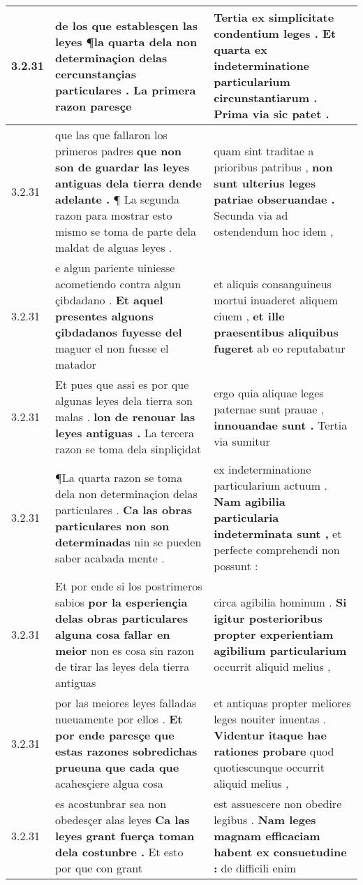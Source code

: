 \begin{tabular}{|p{1cm}|p{6.5cm}|p{6.5cm}|}
3.2.31 & de los que establesçen las leyes \textbf{ ¶la quarta dela non determinaçion delas cercunstançias particulares . } La primera razon paresçe & Tertia ex simplicitate condentium leges . \textbf{ Et quarta ex indeterminatione particularium circunstantiarum . } Prima via sic patet . \\\hline
3.2.31 & que las que fallaron los primeros padres \textbf{ que non son de guardar las leyes antiguas dela tierra dende adelante . } ¶ La segunda razon para mostrar esto mismo se toma de parte dela maldat de alguas leyes . & quam sint traditae a prioribus patribus , \textbf{ non sunt ulterius leges patriae obseruandae . } Secunda via ad ostendendum hoc idem , \\\hline
3.2.31 & e algun pariente uiniesse acometiendo contra algun çibdadano . \textbf{ Et aquel presentes alguons çibdadanos fuyesse del } maguer el non fuesse el matador & et aliquis consanguineus mortui inuaderet aliquem ciuem , \textbf{ et ille praesentibus aliquibus fugeret } ab eo reputabatur \\\hline
3.2.31 & Et pues que assi es por que algunas leyes dela tierra son malas . \textbf{ lon de renouar las leyes antiguas . } La tercera razon se toma dela sinpliçidat & ergo quia aliquae leges paternae sunt prauae , \textbf{ innouandae sunt . } Tertia via sumitur \\\hline
3.2.31 & ¶La quarta razon se toma dela non determinaçion delas particulares . \textbf{ Ca las obras particulares non son determinadas } nin se pueden saber acabada mente . & ex indeterminatione particularium actuum . \textbf{ Nam agibilia particularia indeterminata sunt , } et perfecte comprehendi non possunt : \\\hline
3.2.31 & Et por ende si los postrimeros sabios \textbf{ por la esperiençia delas obras particulares alguna cosa fallar en meior } non es cosa sin razon de tirar las leyes dela tierra antiguas & circa agibilia hominum . \textbf{ Si igitur posterioribus propter experientiam agibilium particularium } occurrit aliquid melius , \\\hline
3.2.31 & por las meiores leyes falladas nueuamente por ellos . \textbf{ Et por ende paresçe que estas razones sobredichas prueuna que cada que } acahesçiere algua cosa & et antiquas propter meliores leges nouiter inuentas . \textbf{ Videntur itaque hae rationes probare } quod quotiescunque occurrit aliquid melius , \\\hline
3.2.31 & es acostunbrar sea non obedesçer alas leyes \textbf{ Ca las leyes grant fuerça toman dela costunbre . } Et esto por que con grant & est assuescere non obedire legibus . \textbf{ Nam leges magnam efficaciam habent ex consuetudine : } de difficili enim \\\hline

\end{tabular}
